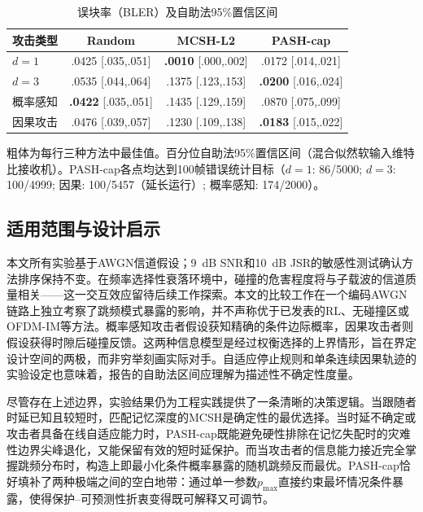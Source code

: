 \documentclass[lettersize,journal]{IEEEtran}
\begin{document}
\begin{table}[!t]
\centering
\caption{误块率（BLER）及自助法95\%置信区间}
\label{tab:bler}
\scriptsize
\setlength{\tabcolsep}{2.0pt}
\begin{tabular}{lccc}
\toprule
攻击类型 & Random & MCSH-L2 & PASH-cap \\
\midrule
$d=1$ & .0425 [.035,.051] & \textbf{.0010} [.000,.002] & .0172 [.014,.021] \\
$d=3$ & .0535 [.044,.064] & .1375 [.123,.153] & \textbf{.0200} [.016,.024] \\
概率感知 & \textbf{.0422} [.035,.051] & .1435 [.129,.159] & .0870 [.075,.099] \\
因果攻击 & .0476 [.039,.057] & .1230 [.109,.138] & \textbf{.0183} [.015,.022] \\
\bottomrule
\end{tabular}

\vspace{3pt}
{\scriptsize 粗体为每行三种方法中最佳值。百分位自助法95\%置信区间（混合似然软输入维特比接收机）。PASH-cap各点均达到100帧错误统计目标（$d{=}1$: 86/5000; $d{=}3$: 100/4999; 因果: 100/5457（延长运行）; 概率感知: 174/2000）。}
\end{table}

\subsection{适用范围与设计启示}
本文所有实验基于AWGN信道假设；9~dB SNR和10~dB JSR的敏感性测试确认方法排序保持不变。在频率选择性衰落环境中，碰撞的危害程度将与子载波的信道质量相关——这一交互效应留待后续工作探索。本文的比较工作在一个编码AWGN链路上独立考察了跳频模式暴露的影响，并不声称优于已发表的RL、无碰撞区或OFDM-IM等方法。概率感知攻击者假设获知精确的条件边际概率，因果攻击者则假设获得时隙后碰撞反馈。这两种信息模型是经过权衡选择的上界情形，旨在界定设计空间的两极，而非穷举刻画实际对手。自适应停止规则和单条连续因果轨迹的实验设定也意味着，报告的自助法区间应理解为描述性不确定性度量。

尽管存在上述边界，实验结果仍为工程实践提供了一条清晰的决策逻辑。当跟随者时延已知且较短时，匹配记忆深度的MCSH是确定性的最优选择。当时延不确定或攻击者具备在线自适应能力时，PASH-cap既能避免硬性排除在记忆失配时的灾难性边界尖峰退化，又能保留有效的短时延保护。而当攻击者的信息能力接近完全掌握跳频分布时，构造上即最小化条件概率暴露的随机跳频反而最优。PASH-cap恰好填补了两种极端之间的空白地带：通过单一参数$p_{\max}$直接约束最坏情况条件暴露，使得保护--可预测性折衷变得既可解释又可调节。

\balance
\end{document}
